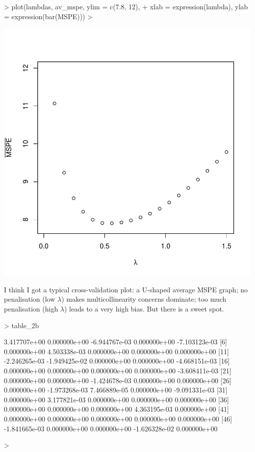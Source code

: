 \documentclass[a4paper,12pt,twoside]{article}
\begin{document}
\begin{Schunk}
\begin{Sinput}
> plot(lambdas, av_mspe, ylim = c(7.8, 12),
+      xlab = expression(lambda), ylab = expression(bar(MSPE)))
> 
\end{Sinput}
\end{Schunk}
\includegraphics{ps2-005}

I think I got a typical cross-validation plot: a U-shaped average MSPE graph; no penalisation (low $\lambda$) makes multicollinearity concerns dominate; too much penalisation (high $\lambda$) leads to a very high bias. But there is a sweet spot.


\begin{Schunk}
\begin{Sinput}
> table_2b
\end{Sinput}
\begin{Soutput}
 [1]  3.417707e+00  0.000000e+00 -6.944767e-03  0.000000e+00 -7.103123e-03
 [6]  0.000000e+00  4.503338e-03  0.000000e+00  0.000000e+00  0.000000e+00
[11] -2.246265e-03 -1.949425e-02  0.000000e+00  0.000000e+00 -4.668151e-03
[16]  0.000000e+00  0.000000e+00  0.000000e+00  0.000000e+00 -3.608411e-03
[21]  0.000000e+00  0.000000e+00 -1.424678e-03  0.000000e+00  0.000000e+00
[26]  0.000000e+00 -1.973268e-03  7.466889e-05  0.000000e+00 -9.091331e-03
[31]  0.000000e+00  3.177821e-03  0.000000e+00  0.000000e+00  0.000000e+00
[36]  0.000000e+00  0.000000e+00  0.000000e+00  4.363195e-03  0.000000e+00
[41]  0.000000e+00  0.000000e+00  0.000000e+00  0.000000e+00  0.000000e+00
[46] -1.841665e-03  0.000000e+00  0.000000e+00 -1.626328e-02  0.000000e+00
\end{Soutput}
\begin{Sinput}
> 
\end{Sinput}
\end{Schunk}
\end{document}
